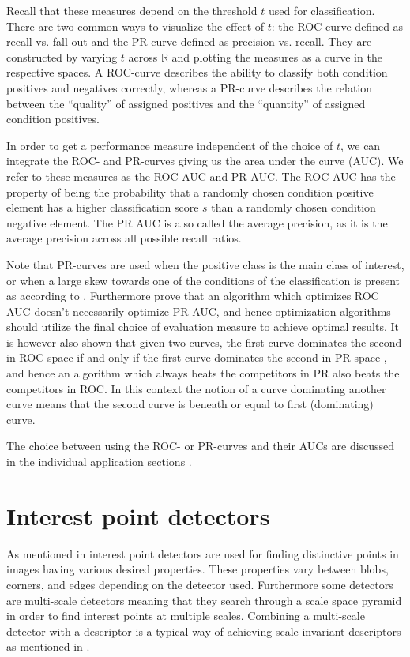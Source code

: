 \documentclass[thesis.tex]{subfiles}
\begin{document}
Recall that these measures depend on the threshold $t$ used for classification. There are two common ways to visualize the effect of $t$: the ROC-curve defined as recall vs. fall-out and the PR-curve defined as precision vs. recall. They are constructed by varying $t$ across $\mathbb{R}$ and plotting the measures as a curve in the respective spaces. A ROC-curve describes the ability to classify both condition positives and negatives correctly, whereas a PR-curve describes the relation between the ``quality'' of assigned positives and the ``quantity'' of assigned condition positives. 

In order to get a performance measure independent of the choice of $t$, we can integrate the ROC- and PR-curves giving us the area under the curve (AUC). We refer to these measures as the ROC AUC and PR AUC. The ROC AUC has the property of being the probability that a randomly chosen condition positive element has a higher classification score $s$ than a randomly chosen condition negative element. The PR AUC is also called the average precision, as it is the average precision across all possible recall ratios.

Note that PR-curves are used when the positive class is the main class of interest, or when a large skew towards one of the conditions of the classification is present as according to \citet{davis2006relationship}. Furthermore \citet{davis2006relationship} prove that an algorithm which optimizes ROC AUC doesn't necessarily optimize PR AUC, and hence optimization algorithms should utilize the final choice of evaluation measure to achieve optimal results. It is however also shown that given two curves, the first curve dominates the second in ROC space if and only if the first curve dominates the second in PR space \cite[Theorem 3.2]{davis2006relationship}, and hence an algorithm which always beats the competitors in PR also beats the competitors in ROC. In this context the notion of a curve dominating another curve means that the second curve is beneath or equal to first (dominating) curve.

The choice between using the ROC- or PR-curves and their AUCs are discussed in the individual application sections .
%

\section{Interest point detectors}
\label{sec:interestPointDetectors}
As mentioned in  interest point detectors are used for finding distinctive points in images having various desired properties. These properties vary between blobs, corners, and edges depending on the detector used. Furthermore some detectors are multi-scale detectors meaning that they search through a scale space pyramid in order to find interest points at multiple scales. Combining a multi-scale detector with a descriptor is a typical way of achieving scale invariant descriptors as mentioned in .
\end{document}
